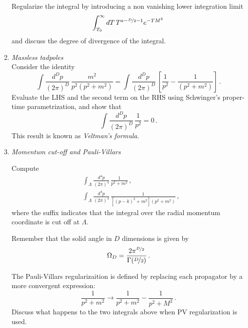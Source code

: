 \documentclass{tutorial}
\begin{document}
\begin{enumerate}
  Regularize the integral by introducing a non vanishing lower
  integration limit
  \[
    \int_{T_0}^\infty dT\, T^{a-\nicefrac{D}{2}-1} e^{-T M^2}\,
  \]
  and discuss the degree of divergence of the integral. 

\item \emph{ Massless tadpoles}\\

  Consider the identity
  \[
    \int \frac{d^Dp}{(2\pi)^D}\, \frac{m^2}{p^2(p^2+m^2)} =
    \int \frac{d^Dp}{(2\pi)^D}\, \left[
      \frac{1}{p^2} - \frac{1}{(p^2+m^2)}
    \right]\, .
  \]
  Evaluate the LHS and the second term on the RHS using Schwinger's
  proper-time parametrization, and show that
  \[
    \int \frac{d^Dp}{(2\pi)^D}\, \frac{1}{p^2} = 0\, .
  \]
  This result is known as {\em Veltman's formula}.

  \bigskip

  \item \emph{ Momentum cut-off and Pauli-Villars}

    Compute
    \begin{align*}
      &\int_\Lambda \frac{d^4p}{(2\pi)^4}\, \frac{1}{p^2+m^2}\, , \\
      &\int_\Lambda \frac{d^4p}{(2\pi)^4}\,
        \frac{1}{\left[(p-k)^2+m^2\right] \left(p^2+m^2\right)}\, ,
    \end{align*}
    where the suffix indicates that the integral over the radial
    momentum coordinate is cut off at $\Lambda$.

    Remember that the solid angle in $D$ dimensions is given by
    \[
      \Omega_D = \frac{2\pi^{\nicefrac{D}{2}}}{\Gamma(\nicefrac{D}{2})}\, .
    \]
   
    The Pauli-Villars regularizaition is defined by replacing each
    propagator by a more convergent expression:
    \[
      \frac{1}{p^2+m^2} \longrightarrow
      \frac{1}{p^2+m^2} - \frac{1}{p^2+M^2} \, .
    \]
    Discuss what happens to the two integrals above when PV
    regularization is used. 
    
\end{enumerate}
\end{document}
